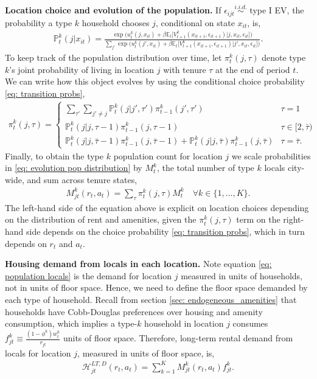 \documentclass[11pt]{article}
\newcommand{\E}{\mathbb{E}}
\newcommand{\Prob}{\mathbb{P}}
\newcommand{\Paragraph}{\vspace{0.1cm}\noindent\textbf}
\begin{document}
\Paragraph{Location choice and evolution of the population.} If $\epsilon_{ijt} \overset{i.i.d.}{\sim}$ type I EV, the probability a type $k$ household chooses $j$, conditional on state $x_{it}$, is,
\begin{align}\label{eq: transition probs}
\Prob^k_t(j|x_{it}) = \frac{\exp\bigg(u_t^k(j, x_{it}) + \beta \E_t\Bigg[ V^k_{t+1}( x_{it+1} , \epsilon_{it+1})|j, x_{it},\epsilon_{it} \Bigg]\bigg)}{\sum_{j'}\exp\bigg(u_t^k(j', x_{it}) + \beta \E_t\Bigg[ V^k_{t+1}( x_{it+1} , \epsilon_{it+1})|j', x_{it},\epsilon_{it} \Bigg]\bigg)}.
\end{align}
To keep track of the population distribution over time, let $\pi_t^k(j,\tau)$ denote type $k$'s joint probability of living in location $j$ with tenure $\tau$ at the end of period $t$. We can write how this object evolves by using the conditional choice probability \ref{eq: transition probs}, 
\begin{align}\label{eq: evolution pop distribution}
    \pi_{t}^k(j,\tau) = \begin{cases}
    \sum_{\tau'} \sum_{j'\neq j} \Prob^k_t(j|j',\tau') \pi_{t-1}^k(j',\tau') & \tau=1\\
    \Prob^k_t(j|j,\tau-1) \pi_{t-1}^k(j,\tau-1)  & \tau \in [2,\bar{\tau})\\
    \Prob^k_t(j|j,\bar{\tau}-1)\pi_{t-1}^k(j,\bar{\tau}-1)  + \Prob^k_t(j|j,\bar{\tau}) \pi_{t-1}^k(j,\bar{\tau}) & \tau = \bar{\tau}.
    \end{cases}
\end{align}
Finally, to obtain the type $k$ population count for location $j$ we scale probabilities in \ref{eq: evolution pop distribution} by $M^k_{t}$, the total number of type $k$ locals city-wide, and sum across tenure states, 
\begin{align}\label{eq: population locals}
    M^{k}_{jt}(r_t,a_t) = \sum_{\tau} \pi_t^k(j,\tau) M^k_t \quad \forall k \in \{1,\dots,K\}.
\end{align}
The left-hand side of the equation above is explicit on location choices depending on the distribution of rent and amenities, given the $\pi_t^k(j,\tau)$ term on the right-hand side depends on the choice probability \ref{eq: transition probs}, which in turn depends on $r_t$ and $a_t$. 

\Paragraph{Housing demand from locals in each location.} Note equation \eqref{eq: population locals} is the demand for location $j$ measured in units of households, not in units of floor space. Hence, we need to define the floor space demanded by each type of household. Recall from section \ref{sec: endogeneous_amenities} that households have Cobb-Douglas preferences over housing and amenity consumption, which implies a type-$k$ household in location $j$ consumes $f_{jt}^k\equiv \frac{(1-\phi^k)w^k_t}{r_{jt}}$ units of floor space. Therefore, long-term rental demand from locals for location $j$, measured in units of floor space, is,
\begin{align}\label{eq: housing demand - LT}
    \mathcal{H}^{LT,D}_{jt}(r_t,a_t) = \sum_{k=1}^K M^{k}_{jt}(r_t,a_t) f_{jt}^k.
\end{align}
\end{document}
